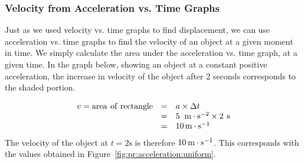         \label{m38795*uid115}
\subsubsection*{Velocity from Acceleration vs. Time Graphs}
            \nopagebreak
          \label{m38795*id72754}Just as we used velocity vs. time graphs to find displacement, we can use acceleration vs. time graphs to find the velocity of an object at a given moment in time. We simply calculate the area under the acceleration vs. time graph, at a given time. In the graph below, showing an object at a constant positive acceleration, the increase in velocity of the object after 2 seconds corresponds to the shaded portion.\par 
          \label{m38795*id72760}\nopagebreak\noindent{}
            
    \begin{equation*}
    \begin{array}{ccc}\hfill v=\text{area}\phantom{\rule{4pt}{0ex}}\text{of}\phantom{\rule{4pt}{0ex}}\text{rectangle}& =& a\ensuremath{\times}\Delta t\hfill \\ & =& 5\phantom{\rule{4pt}{0ex}}\phantom{\rule{0.166667em}{0ex}}\text{m}\ensuremath{\cdot}{\text{s}}^{-2}\ensuremath{\times}2\phantom{\rule{4pt}{0ex}}\text{s}\hfill \\ & =& 10\phantom{\rule{0.166667em}{0ex}}\text{m}\ensuremath{\cdot}{\text{s}}^{-1}\hfill \end{array}
      \end{equation*}
          \label{m38795*id72897}The velocity of the object at $t=2\text{s}$ is therefore $10\phantom{\rule{2pt}{0ex}}\text{m}\ensuremath{\cdot}\text{s}{}^{-1}$. This corresponds with the values obtained in Figure~\ref{fig:pr:acceleration:uniform}.\par 
    \label{m38795*cid8}
